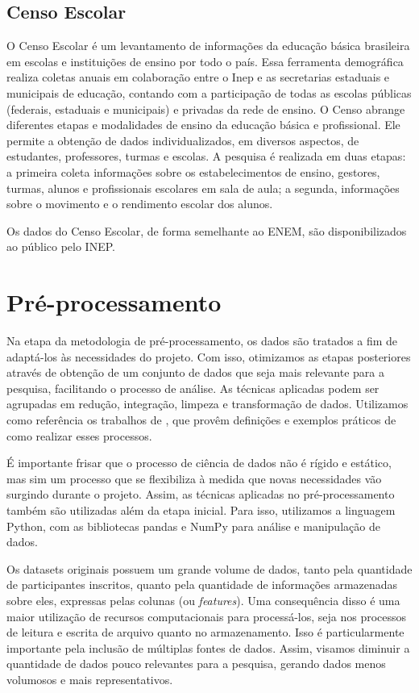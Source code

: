 \subsection{Censo Escolar}
O Censo Escolar é um levantamento de informações da educação básica brasileira em escolas e instituições de ensino por todo o país. Essa ferramenta demográfica realiza coletas anuais em colaboração entre o Inep e as secretarias estaduais e municipais de educação, contando com a participação de todas as escolas públicas (federais, estaduais e municipais) e privadas da rede de ensino. O Censo abrange diferentes etapas e modalidades de ensino da educação básica e profissional. Ele permite a obtenção de dados individualizados, em diversos aspectos, de estudantes, professores, turmas e escolas. A pesquisa é realizada em duas etapas: a primeira coleta informações sobre os estabelecimentos de ensino, gestores, turmas, alunos e profissionais escolares em sala de aula; a segunda, informações sobre o movimento e o rendimento escolar dos alunos. 

Os dados do Censo Escolar, de forma semelhante ao ENEM, são disponibilizados ao público pelo INEP. 


\section{Pré-processamento}
Na etapa da metodologia de pré-processamento, os dados são tratados a fim de adaptá-los às necessidades do projeto.
Com isso, otimizamos as etapas posteriores através de obtenção de um conjunto de dados que seja mais relevante para a pesquisa, facilitando o processo de análise. 
As técnicas aplicadas podem ser agrupadas em redução, integração, limpeza e transformação de dados. Utilizamos como referência os trabalhos de \citet{Jafari2022, Garcia2016},
que provêm definições e exemplos práticos de como realizar esses processos.

É importante frisar que o processo de ciência de dados não é rígido e estático, mas sim um processo que se flexibiliza à medida que novas necessidades vão surgindo durante o projeto. Assim, as técnicas aplicadas no pré-processamento também são utilizadas além da etapa inicial. Para isso, utilizamos a linguagem Python, com as bibliotecas pandas e NumPy para análise e manipulação de dados.

Os datasets originais possuem um grande volume de dados, tanto pela quantidade de participantes inscritos, 
quanto pela quantidade de informações armazenadas sobre eles, expressas pelas colunas (ou \textit{features}). 
Uma consequência disso é uma maior utilização de recursos computacionais para processá-los, seja nos processos 
de leitura e escrita de arquivo quanto no armazenamento. Isso é particularmente importante pela inclusão de múltiplas fontes de dados. 
Assim, visamos diminuir a quantidade de dados pouco relevantes para a pesquisa, gerando dados menos volumosos e mais representativos. 

